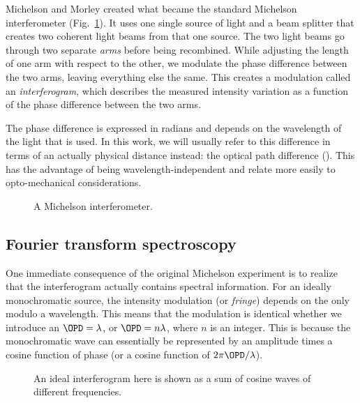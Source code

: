 Michelson and Morley created what became the standard Michelson interferometer (Fig.~\ref{fig:michelson}). It uses one single source of light and a beam splitter that creates two coherent light beams from that one source. The two light beams go through two separate \textit{arms} before being recombined. While adjusting the length of one arm with respect to the other, we modulate the phase difference between the two arms, leaving everything else the same. This creates a modulation called an \textit{interferogram}, which describes the measured intensity variation as a function of the phase difference between the two arms.

The phase difference is expressed in radians and depends on the wavelength of the light that is used. In this work, we will usually refer to this difference in terms of an actually physical distance instead: the optical path difference (\OPD). This has the advantage of being wavelength-independent and relate more easily to opto-mechanical considerations.

\begin{figure}[!ht]
	\centering
	
	\caption[Michelson interferometer]{A Michelson interferometer.}
	\label{fig:michelson}
    \end{figure}



\subsection{Fourier transform spectroscopy}

One immediate consequence of the original Michelson experiment is to realize that the interferogram actually contains spectral information. For an ideally monochromatic source, the intensity modulation (or \textit{fringe}) depends on the \OPD only modulo a wavelength. This means that the modulation is identical whether we introduce an $\OPD = \lambda$, or $\OPD = n\lambda$, where $n$ is an integer. This is because the monochromatic wave can essentially be represented by an amplitude times a cosine function of phase (or a cosine function of $2\pi\OPD/\lambda$).

\begin{figure}[!ht]
	\centering
	
	\caption[Simple interferogram]{An ideal interferogram here is shown as a sum of cosine waves of different frequencies.}
	\label{fig:interferogram}
    \end{figure}


